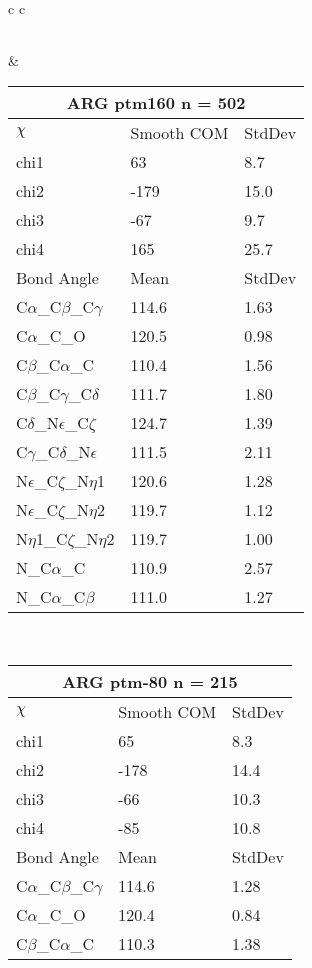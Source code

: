 \begin{longtable}{ c c }
\begin{tabular}{ l l l }
  \bottomrule
  \end{tabular}
  &
  \begin{tabular}{ l l l }
  \toprule
  \multicolumn{3}{c}{ARG \textbf{ptm160} n = 502} \\ \toprule
  $\chi$       & Smooth COM & StdDev \\ \midrule
  chi1 & 63 & 8.7 \\ 
  chi2 & -179 & 15.0 \\ 
  chi3 & -67 & 9.7 \\ 
  chi4 & 165 & 25.7 \\ \midrule
  Bond Angle   & Mean     & StdDev \\ \midrule
  C$\alpha$\_C$\beta$\_C$\gamma$ & 114.6 & 1.63\\
  C$\alpha$\_C\_O & 120.5 & 0.98\\
  C$\beta$\_C$\alpha$\_C & 110.4 & 1.56\\
  C$\beta$\_C$\gamma$\_C$\delta$ & 111.7 & 1.80\\
  C$\delta$\_N$\epsilon$\_C$\zeta$ & 124.7 & 1.39\\
  C$\gamma$\_C$\delta$\_N$\epsilon$ & 111.5 & 2.11\\
  N$\epsilon$\_C$\zeta$\_N$\eta$1 & 120.6 & 1.28\\
  N$\epsilon$\_C$\zeta$\_N$\eta$2 & 119.7 & 1.12\\
  N$\eta$1\_C$\zeta$\_N$\eta$2 & 119.7 & 1.00\\
  N\_C$\alpha$\_C & 110.9 & 2.57\\
  N\_C$\alpha$\_C$\beta$ & 111.0 & 1.27\\
  \bottomrule
  \end{tabular}
  \\
  \begin{tabular}{ l l l }
  \toprule
  \multicolumn{3}{c}{ARG \textbf{ptm-80} n = 215} \\ \toprule
  $\chi$       & Smooth COM & StdDev \\ \midrule
  chi1 & 65 & 8.3 \\ 
  chi2 & -178 & 14.4 \\ 
  chi3 & -66 & 10.3 \\ 
  chi4 & -85 & 10.8 \\ \midrule
  Bond Angle   & Mean     & StdDev \\ \midrule
  C$\alpha$\_C$\beta$\_C$\gamma$ & 114.6 & 1.28\\
  C$\alpha$\_C\_O & 120.4 & 0.84\\
  C$\beta$\_C$\alpha$\_C & 110.3 & 1.38\\

\end{tabular}
\end{longtable}
